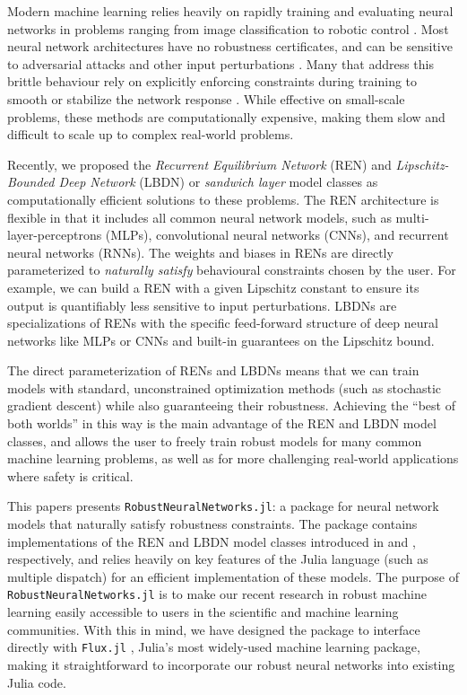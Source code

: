 Modern machine learning relies heavily on rapidly training and evaluating neural networks in problems ranging from image classification \cite{He++2016} to robotic control \cite{Siekmann++2021a}. Most neural network architectures have no robustness certificates, and can be sensitive to adversarial attacks and other input perturbations \cite{Huang++2017}. Many that address this brittle behaviour rely on explicitly enforcing constraints during training to smooth or stabilize the network response \cite{Pauli++2022,Junnarkar++2023}. While effective on small-scale problems, these methods are computationally expensive, making them slow and difficult to scale up to complex real-world problems.

Recently, we proposed the \textit{Recurrent Equilibrium Network} (REN) \cite{Revay++2021b} and \textit{Lipschitz-Bounded Deep Network} (LBDN) or \textit{sandwich layer} \cite{Wang+Manchester2023} model classes as computationally efficient solutions to these problems. The REN architecture is flexible in that it includes all common neural network models, such as multi-layer-perceptrons (MLPs), convolutional neural networks (CNNs), and recurrent neural networks (RNNs). The weights and biases in RENs are directly parameterized to \textit{naturally satisfy} behavioural constraints chosen by the user. For example, we can build a REN with a given Lipschitz constant to ensure its output is quantifiably less sensitive to input perturbations. LBDNs are specializations of RENs with the specific feed-forward structure of deep neural networks like MLPs or CNNs and built-in guarantees on the Lipschitz bound.

The direct parameterization of RENs and LBDNs means that we can train models with standard, unconstrained optimization methods (such as stochastic gradient descent) while also guaranteeing their robustness. Achieving the “best of both worlds” in this way is the main advantage of the REN and LBDN model classes, and allows the user to freely train robust models for many common machine learning problems, as well as for more challenging real-world applications where safety is critical.

This papers presents \verb|RobustNeuralNetworks.jl|: a package for neural network models that naturally satisfy robustness constraints. The package contains implementations of the REN and LBDN model classes introduced in \cite{Revay++2021b} and \cite{Wang+Manchester2023}, respectively, and relies heavily on key features of the Julia language \cite{Bezanson++2017} (such as multiple dispatch) for an efficient implementation of these models. The purpose of \verb|RobustNeuralNetworks.jl| is to make our recent research in robust machine learning easily accessible to users in the scientific and machine learning communities. With this in mind, we have designed the package to interface directly with \verb|Flux.jl| \cite{Innes2018}, Julia's most widely-used machine learning package, making it straightforward to incorporate our robust neural networks into existing Julia code.

